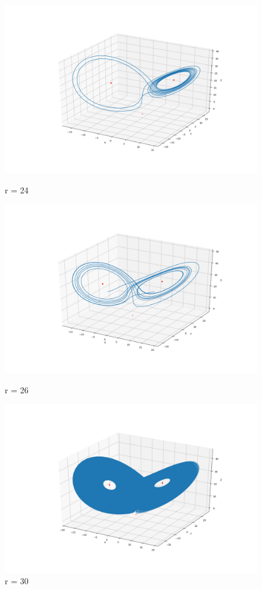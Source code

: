 \documentclass[11pt, a4paper, reqno]{scrartcl}
\begin{document}
        \begin{figure}
        	\includegraphics[scale = 0.25]{plot_3.png}
            \caption{r = 24}
            \includegraphics[scale = 0.25]{plot_4.png}
            \caption{r = 26}
            \includegraphics[scale = 0.25]{plot_5.png}
            \caption{r = 30}
        \end{figure}
        
\end{document}
